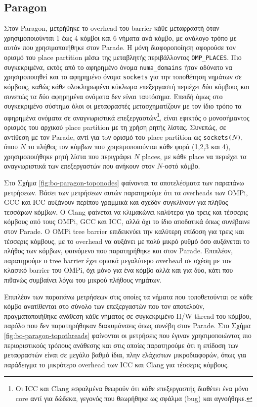 \subsection{Paragon}
Στον Paragon, μετρήθηκε το overhead του barrier κάθε μεταφραστή όταν χρησιμοποιούνται 1 έως 4 κόμβοι και 6 νήματα ανά κόμβο, με ανάλογο τρόπο με αυτόν που χρησιμοποιήθηκε στον Parade. Η μόνη διαφοροποίηση αφορούσε τον ορισμό του place partition μέσω της μεταβλητής περιβάλλοντος \texttt{OMP\_PLACES}. Πιο συγκεκριμένα, εκτός από το αφηρημένο όνομα \texttt{numa\_domains} ήταν αδύνατο να χρησιμοποιηθεί και το αφηρημένο όνομα \texttt{sockets} για την τοποθέτηση νημάτων σε κόμβους, καθώς κάθε ολοκληρωμένο κύκλωμα επεξεργαστή περιέχει δύο κόμβους και συνεπώς τα δύο αφηρημένα ονόματα δεν είναι ταυτόσημα. Επειδή όμως στο συγκεκριμένο σύστημα όλοι οι μεταφραστές μετασχηματίζουν με τον ίδιο τρόπο τα αφηρημένα ονόματα σε αναγνωριστικά επεξεργαστών\footnote{Οι ICC και Clang εσφαλμένα θεωρούν ότι κάθε επεξεργαστής διαθέτει ένα μόνο core αντί για δώδεκα, γεγονός που θεωρήθηκε ως σφάλμα (bug) και αγνοήθηκε.}, είναι εφικτός ο μονοσήμαντος ορισμός του αρχικού place partition με τη χρήση ρητής λίστας. Συνεπώς, σε αντίθεση με τον Parade, αντί για τoν ορισμό του place partition ως \texttt{sockets($N$)}, όπου $N$ το πλήθος τον κόμβων που χρησιμοποιούνται κάθε φορά (1,2,3 και 4), χρησιμοποιήθηκε ρητή λίστα που περιγράφει $N$ places, με κάθε place να περιέχει τα αναγνωριστικά των επεξεργαστών που ανήκουν στον $N$-οστό κόμβο.

Στο Σχήμα \ref{fig:bo-paragon-toponodes} φαίνονται τα αποτελέσματα των παραπάνω μετρήσεων. Βάσει των μετρήσεων αυτών παρατηρούμε ότι τα overheads των OMPi, GCC και ICC αυξάνουν περίπου γραμμικά και σχεδόν συγκλίνουν για πλήθος τεσσάρων κόμβων. Ο Clang φαίνεται να κλιμακώνει καλύτερα για τρεις και τέσσερις κόμβους από τους OMPi, GCC και ICC, αλλά όχι το ίδιο αποδοτικά όπως συνέβαινε στον Parade. Ο OMPi tree barrier επιδεικνύει την καλύτερη επίδοση για τρεις και τέσσερις κόμβους, με το overhead να αυξάνει με πολύ μικρό ρυθμό όσο αυξάνεται το πλήθος των κόμβων, φαινόμενο που παρατηρήθηκε και στον Parade. Επιπλέον, παρατηρούμε ο tree barrier έχει οριακά μεγαλύτερο overhead σε σχέση με τον κλασικό barrier του OMPi, όχι μόνο για ένα κόμβο αλλά και για δύο, κάτι που πιθανώς συμβαίνει λόγω του μικρού πλήθους νημάτων.

Επιπλέον των παραπάνω μετρήσεων στις οποίες τα νήματα που τοποθετούνται σε κάθε κόμβο ανατίθενται στο σύνολο των επεξεργαστών που τον αποτελούν, πραγματοποιήθηκε ανάθεση κάθε νήματος σε συγκεκριμένο H/W thread του κόμβου, παρόλο που δεν παρατηρήθηκαν διακυμάνσεις όπως συνέβη στον Parade. Στο Σχήμα \ref{fig:bo-paragon-topothreads} φαίνονται οι μετρήσεις που έγιναν χρησιμοποιώντας πιο περιοριστικούς τρόπους ανάθεσης και στις οποίες παρατηρούμε ότι η επίδοση των μεταφραστών είναι σε μεγάλο βαθμό ίδια, πλην ελάχιστων μικροδιαφορών, όπως για παράδειγμα το μικρότερο overhead των ICC και Clang για τέσσερις κόμβους.

